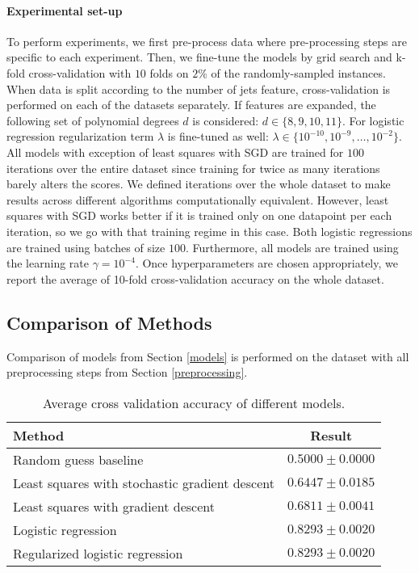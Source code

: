 \paragraph{Experimental set-up} 
To perform experiments, we first pre-process data where pre-processing steps are specific to each experiment. Then, we fine-tune the models by grid search and k-fold cross-validation with $10$ folds on $2\%$ of the randomly-sampled instances. When data is split according to the number of jets feature, cross-validation is performed on each of the datasets separately. If features are expanded, the following set of polynomial degrees $d$ is considered: $d \in \{8, 9, 10, 11\}$. For logistic regression regularization term $\lambda$ is fine-tuned as well: $\lambda \in  \{10^{-10}, 10^{-9}, \dots, 10^{-2}\}$. All models with exception of least squares with SGD are trained for $100$ iterations over the entire dataset since training for twice as many iterations barely alters the scores. We defined iterations over the whole dataset to make results across different algorithms computationally equivalent. However, least squares with SGD works better if it is trained only on one datapoint per each iteration, so we go with that training regime in this case. Both logistic regressions are trained using batches of size $100$. Furthermore, all models are trained using the learning rate $\gamma = 10^{-4}$. Once hyperparameters are chosen appropriately, we report the average of 10-fold cross-validation accuracy on the whole dataset.



\subsection{Comparison of Methods}

Comparison of models from Section \ref{models} is performed on the dataset with all preprocessing steps from Section \ref{preprocessing}.


\begin{table}
  \caption{Average cross validation accuracy of different models.}
  \label{comparison-of-methods}
  \centering
  \begin{tabular}{lc}
    \toprule
    \textbf{Method} & \textbf{Result} \\
    \midrule
    Random guess baseline\footnotemark & $0.5000 \pm 0.0000$  \\
    Least squares with stochastic gradient descent & $0.6447 \pm 0.0185$ \\
    Least squares with gradient descent & $0.6811 \pm 0.0041$ \\
    Logistic regression &  $0.8293 \pm 0.0020$ \\
    Regularized logistic regression  & $0.8293 \pm 0.0020$ \\
    \bottomrule
  \end{tabular}
\end{table}

